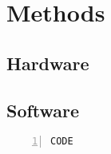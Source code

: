 \section{Methods}\label{methods}

\subsection{Hardware}

\subsection{Software}
\begin{Verbatim}[numbers=left,fontsize=\small]
  CODE
\end{Verbatim}
